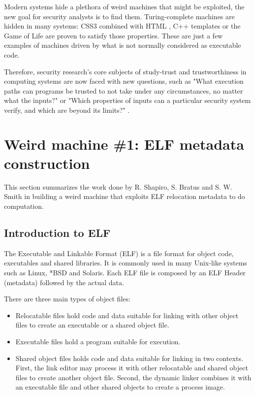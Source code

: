 \documentclass[11pt,twoside,a4paper]{article}
\begin{document}
Modern systems hide a plethora of weird machines that might be exploited, the new goal for security analysts is to find them.   Turing-complete machines are hidden in many systems: CSS3 combined with HTML \cite{html}, C++ templates \cite{cpp_templates} or the Game of Life are proven to satisfy those properties. These are just a few examples of machines driven by what is not normally considered as executable code.

Therefore, security research's core subjects of study-trust and trustworthiness in computing systems are now faced with new questions, such as "What execution paths can programs be trusted to not take under any circumstances, no matter what the inputs?" or "Which properties of inputs can a particular security system verify, and which are beyond its limits?" \cite{bratus}.



\section{Weird machine \#1: ELF metadata construction}

This section summarizes the work done by R. Shapiro, S. Bratus and S. W. Smith \cite{elf_machine} in building a weird machine that exploits ELF relocation metadata to do computation.

\subsection{Introduction to ELF}
The Executable and Linkable Format (ELF) is a file format for object code, executables and shared libraries. It is commonly used in many Unix-like systems such as Linux, *BSD and Solaris.
Each ELF file is composed by an ELF Header (metadata) followed by the actual data.

There are three main types of object files:
\begin{itemize}
\item Relocatable files hold code and data suitable for linking with other object files to create an
executable or a shared object file.
\item Executable files hold a program suitable for execution.
\item Shared object files holds code and data suitable for linking in two contexts. First, the link editor may process it with other relocatable and shared object files to create another object file. Second, the dynamic linker combines it with an executable file and other shared objects to create a process image.
\end{itemize}
\end{document}
